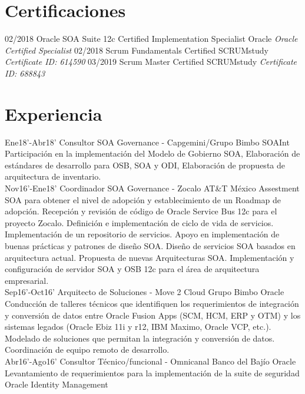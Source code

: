 \documentclass[]{friggeri-cv}
\begin{document}
\section{Certificaciones}
\begin{entrylist}
  \entry
    {02/2018}
    {Oracle SOA Suite 12c Certified Implementation Specialist}
    {Oracle}
    {\emph{Oracle Certified Specialist}}
     \entry
    {02/2018}
    {Scrum Fundamentals Certified}
    {SCRUMstudy}
    {\emph{Certificate ID: 614590}}
     \entry
    {03/2019}
    {Scrum Master Certified}
    {SCRUMstudy}
    {\emph{Certificate ID: 688843}}
\end{entrylist}

\section{Experiencia}
\begin{entrylist}
  \entry
    {Ene18'-Abr18'}
    {Consultor SOA Governance - Capgemini/Grupo Bimbo}
    {SOAInt}
    {Participación en la implementación del Modelo de Gobierno SOA, Elaboración de estándares de desarrollo para OSB, SOA y ODI, Elaboración de propuesta de arquitectura de inventario.\\}
  \entry
    {Nov16'-Ene18'}
    {Coordinador SOA Governance - Zocalo}
    {AT\&T México}
    {Assestment SOA para obtener el nivel de adopción y establecimiento de un Roadmap de adopción. Recepción y revisión de código de Oracle Service Bus 12c para el proyecto Zocalo. Definición e implementación de ciclo de vida de servicios. Implementación de un repositorio de servicios. Apoyo en implementación de buenas prácticas y patrones de diseño SOA. Diseño de servicios SOA basados en arquitectura actual. Propuesta de nuevas Arquitecturas SOA. Implementación y configuración de servidor SOA y OSB 12c para el área de arquitectura empresarial.\\}
  \entry
    {Sep16'-Oct16'}
    {Arquitecto de Soluciones - Move 2 Cloud Grupo Bimbo}
    {Oracle}
    {Conducción de talleres técnicos que identifiquen los requerimientos de integración y conversión de datos entre Oracle Fusion Apps (SCM, HCM, ERP y OTM) y los sistemas legados (Oracle Ebiz 11i y r12, IBM Maximo, Oracle VCP, etc.). Modelado de soluciones que permitan la integración y conversión de datos. Coordinación de equipo remoto de desarrollo. \\}
  \entry
    {Abr16'-Ago16'}
    {Consultor Técnico/funcional - Omnicanal Banco del Bajío}
    {Oracle}
    {Levantamiento de requerimientos para la implementación de la suite de seguridad Oracle Identity Management\\}
   
\end{entrylist}
\\
\newpage
\end{document}
